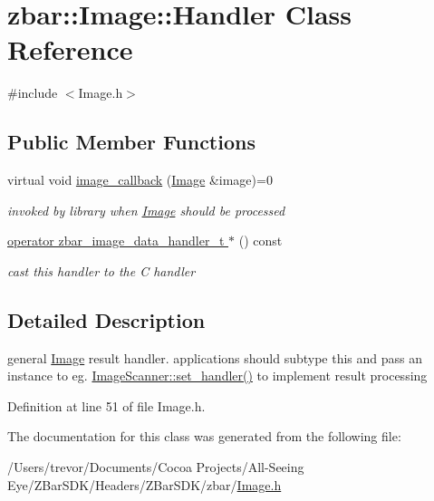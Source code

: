 \hypertarget{classzbar_1_1_image_1_1_handler}{
\section{zbar::Image::Handler Class Reference}
\label{classzbar_1_1_image_1_1_handler}
}


{\ttfamily \#include $<$Image.h$>$}

\subsection*{Public Member Functions}
\begin{DoxyCompactItemize}
\item 
\hypertarget{classzbar_1_1_image_1_1_handler_a4b2014955e5e72cdda49271a0fc70a83}{
virtual void \hyperlink{classzbar_1_1_image_1_1_handler_a4b2014955e5e72cdda49271a0fc70a83}{image\_\-callback} (\hyperlink{classzbar_1_1_image}{Image} \&image)=0}
\label{classzbar_1_1_image_1_1_handler_a4b2014955e5e72cdda49271a0fc70a83}

\begin{DoxyCompactList}\small\item\em invoked by library when \hyperlink{classzbar_1_1_image}{Image} should be processed \end{DoxyCompactList}\item 
\hypertarget{classzbar_1_1_image_1_1_handler_ae63ee5545f45300f491ec8c2cc9991e7}{
\hyperlink{classzbar_1_1_image_1_1_handler_ae63ee5545f45300f491ec8c2cc9991e7}{operator zbar\_\-image\_\-data\_\-handler\_\-t $\ast$} () const }
\label{classzbar_1_1_image_1_1_handler_ae63ee5545f45300f491ec8c2cc9991e7}

\begin{DoxyCompactList}\small\item\em cast this handler to the C handler \end{DoxyCompactList}\end{DoxyCompactItemize}


\subsection{Detailed Description}
general \hyperlink{classzbar_1_1_image}{Image} result handler. applications should subtype this and pass an instance to eg. \hyperlink{classzbar_1_1_image_scanner_a71c9944f89df97c81eae00d0ada446f5}{ImageScanner::set\_\-handler()} to implement result processing 

Definition at line 51 of file Image.h.



The documentation for this class was generated from the following file:\begin{DoxyCompactItemize}
\item 
/Users/trevor/Documents/Cocoa Projects/All-\/Seeing Eye/ZBarSDK/Headers/ZBarSDK/zbar/\hyperlink{_image_8h}{Image.h}\end{DoxyCompactItemize}
